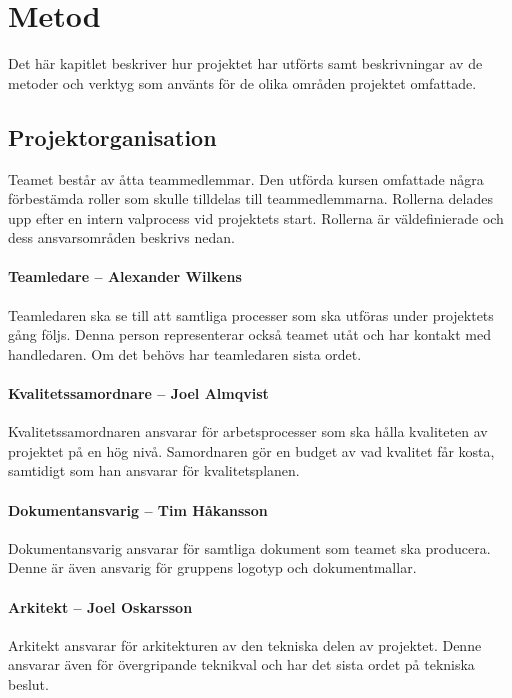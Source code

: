 \chapter{Metod}
\label{cha:method}
Det här kapitlet beskriver hur projektet har utförts samt beskrivningar av de metoder och verktyg som använts för de olika områden projektet omfattade.

\section{Projektorganisation}
Teamet består av åtta teammedlemmar. Den utförda kursen omfattade några förbestämda roller som skulle tilldelas till teammedlemmarna. Rollerna delades upp efter en intern valprocess vid projektets start. Rollerna är väldefinierade och dess ansvarsområden beskrivs nedan.

\subsubsection*{Teamledare -- Alexander Wilkens}
Teamledaren ska se till att samtliga processer som ska utföras under projektets gång följs. Denna person representerar också teamet utåt och har kontakt med handledaren. Om det behövs har teamledaren sista ordet.

\subsubsection*{Kvalitetssamordnare -- Joel Almqvist}
Kvalitetssamordnaren ansvarar för arbetsprocesser som ska hålla kvaliteten av projektet på en hög nivå. Samordnaren gör en budget av vad kvalitet får kosta, samtidigt som han ansvarar för kvalitetsplanen.

\subsubsection*{Dokumentansvarig -- Tim Håkansson}
Dokumentansvarig ansvarar för samtliga dokument som teamet ska producera. Denne är även ansvarig för gruppens logotyp och dokumentmallar.

\subsubsection*{Arkitekt -- Joel Oskarsson}
Arkitekt ansvarar för arkitekturen av den tekniska delen av projektet. Denne ansvarar även för övergripande teknikval och har det sista ordet på tekniska beslut.

